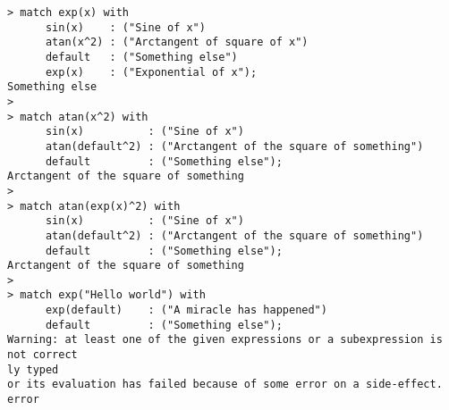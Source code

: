 \begin{center}\begin{minipage}{15cm}\begin{Verbatim}[frame=single]
> match exp(x) with 
      sin(x)    : ("Sine of x")
      atan(x^2) : ("Arctangent of square of x")
      default   : ("Something else")
      exp(x)    : ("Exponential of x");
Something else
> 
> match atan(x^2) with 
      sin(x)          : ("Sine of x")
      atan(default^2) : ("Arctangent of the square of something")
      default         : ("Something else");
Arctangent of the square of something
> 
> match atan(exp(x)^2) with 
      sin(x)          : ("Sine of x")
      atan(default^2) : ("Arctangent of the square of something")
      default         : ("Something else");
Arctangent of the square of something
> 
> match exp("Hello world") with 
      exp(default)    : ("A miracle has happened")
      default         : ("Something else");
Warning: at least one of the given expressions or a subexpression is not correct
ly typed
or its evaluation has failed because of some error on a side-effect.
error
\end{Verbatim}
\end{minipage}\end{center}

